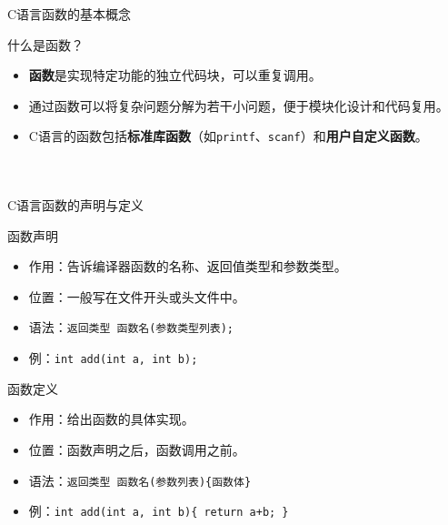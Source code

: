 \documentclass[UTF8,aspectratio=169]{beamer}
\begin{document}
\begin{frame}{C语言函数的基本概念}
    \begin{ytublock}{什么是函数？}
        \begin{itemize}
            \item \textbf{函数}是实现特定功能的独立代码块，可以重复调用。
            \item 通过函数可以将复杂问题分解为若干小问题，便于模块化设计和代码复用。
            \item C语言的函数包括\textbf{标准库函数}（如\texttt{printf}、\texttt{scanf}）和\textbf{用户自定义函数}。
        \end{itemize}
    \end{ytublock}
    \begin{columns}
        \begin{column}{0.48\textwidth}
            \inputminted[firstline=1,lastline=7]{cpp}{code/c_function_simple.c}
        \end{column}
        \begin{column}{0.48\textwidth}
            \inputminted[firstline=9,lastline=17]{cpp}{code/c_function_simple.c}
        \end{column}
    \end{columns}
\end{frame}

\begin{frame}{C语言函数的声明与定义}
    \begin{ytublock}{函数声明}
        \begin{itemize}
            \item 作用：告诉编译器函数的名称、返回值类型和参数类型。
            \item 位置：一般写在文件开头或头文件中。
            \item 语法：\texttt{返回类型 函数名(参数类型列表);}
            \item 例：\texttt{int add(int a, int b);}
        \end{itemize}
    \end{ytublock}
    \begin{ytublock}{函数定义}
        \begin{itemize}
            \item 作用：给出函数的具体实现。
            \item 位置：函数声明之后，函数调用之前。
            \item 语法：\texttt{返回类型 函数名(参数列表)\{函数体\}}
            \item 例：\texttt{int add(int a, int b)\{ return a+b; \}}
        \end{itemize}
    \end{ytublock}
\end{frame}
\end{document}
